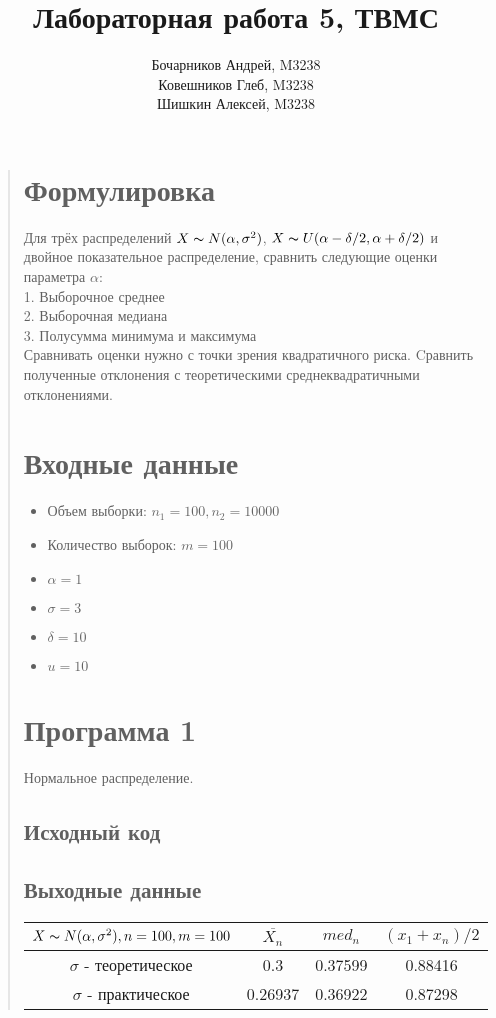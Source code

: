 \documentclass{article}
\begin{document}
\title{Лабораторная работа 5, ТВМС}
\author{
	Бочарников Андрей, M3238\\
	Ковешников Глеб, M3238\\
	Шишкин Алексей, M3238
}
\maketitle

\begin{quote}
\section{Формулировка}
	Для трёх распределений $X \thicksim N(\alpha, \sigma^2)$, $X \thicksim U(\alpha - \delta / 2, \alpha + \delta / 2)$ и двойное показательное распределение, сравнить следующие оценки параметра $\alpha$:\\
	1. Выборочное среднее \\
	2. Выборочная медиана \\
	3. Полусумма минимума и максимума \\
	Сравнивать оценки нужно с точки зрения квадратичного риска. Cравнить полученные отклонения с теоретическими среднеквадратичными отклонениями.
\section{Входные данные}
        \begin{itemize}
            \item Объем выборки: $n_1 = 100, n_2 = 10000$
	    \item Количество выборок: $m = 100$
            \item $\alpha = 1$
	    \item $\sigma = 3$
	    \item $\delta = 10$
	    \item $u = 10$ 
        \end{itemize}
\section{Программа 1}	
        Нормальное распределение. \\
\subsection{Исходный код}
	
\subsection{Выходные данные}
\renewcommand{\arraystretch}{1.8}
\begin{tabular}{ | c | c | c | c | }
\hline
$X \thicksim N(\alpha, \sigma^2), n = 100, m = 100$ & $\overline{X_n}$ & $med_n$ & $(x_1 + x_n) / 2$ \\ \hline
$\sigma$ - теоретическое &  0.3 & 0.37599 & 0.88416 \\ \hline
$\sigma$ - практическое & 0.26937 & 0.36922 & 0.87298 \\
\hline
\end{tabular}


\end{quote}
\end{document}

